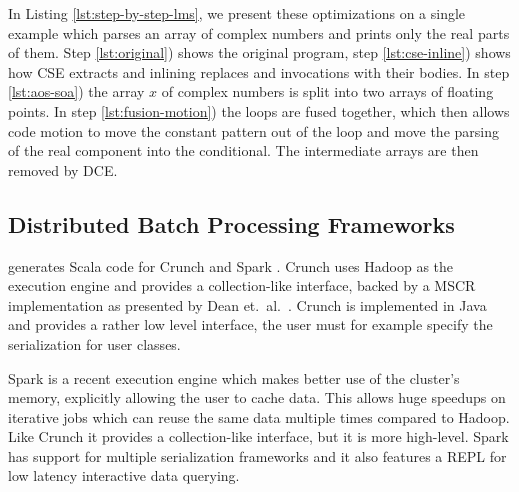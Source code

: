 In Listing \ref{lst:step-by-step-lms}, we present these optimizations on a
single example which parses an array of complex numbers and prints only the real parts of them.
Step \ref{lst:original}) shows the original program, step \ref{lst:cse-inline})
shows how CSE extracts  and inlining replaces  and 
invocations with their bodies. In step \ref{lst:aos-soa}) the array $x$ of
complex numbers is split into two arrays of floating points.
In step \ref{lst:fusion-motion}) the loops are fused together, which then allows
code motion to move the constant pattern out of the loop and move the parsing of the
real component into the conditional. The intermediate arrays are then removed
by DCE.

\subsection{Distributed Batch Processing Frameworks}
\label{subsed:big-data-frameworks}

\tool generates Scala code for Crunch \cite{crunch} and Spark \cite{spark-nsdi}.
Crunch uses Hadoop as the execution engine and provides a collection-like
interface, backed by a MSCR implementation as presented by Dean et.\ al.\
\cite{chambers_flumejava:_2010}. Crunch is implemented in Java and provides a
rather low level interface, the user must for example specify the serialization
for user classes.

Spark is a recent execution engine which makes better use of the cluster's
memory, explicitly allowing the user to cache data. This allows huge speedups on
iterative jobs which can reuse the same data multiple times compared to Hadoop.
Like Crunch it provides a collection-like interface, but it is more high-level.
Spark has support for multiple serialization frameworks and it also features a
REPL for low latency interactive data querying.

